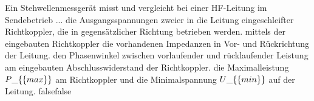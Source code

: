     {Ein Stehwellenmessgerät misst und vergleicht bei einer HF-Leitung im Sendebetrieb ...}
    {die Ausgangsspannungen zweier in die Leitung eingeschleifter Richtkoppler, die in gegensätzlicher Richtung betrieben werden.  }
    {mittels der eingebauten Richtkoppler die vorhandenen Impedanzen in Vor- und Rückrichtung der Leitung.}
    {den Phasenwinkel zwischen vorlaufender und rücklaufender Leistung am eingebauten Abschlusswiderstand der Richtkoppler.}
    {die Maximalleistung $P\_\{\textrm\{max\}\}$ am Richtkoppler und die Minimalspannung $U\_\{\textrm\{min\}\}$ auf der Leitung.}
    {false}{false}